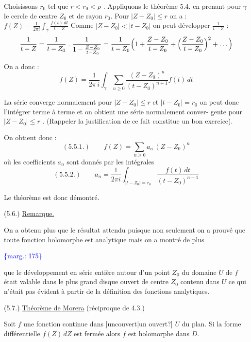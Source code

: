 \documentclass[11pt]{article}
\newcommand{\scanpage}[1]{\par\bigskip\noindent{\small\sffamily[scan #1]}\par}
\newcommand{\mspage}[1]{{\small\sffamily[p.\,#1]}}
\newcommand{\margin}[1]{\textcolor{blue}{\{\textsf{marg.:} #1\}}}
\newcommand{\uline}[1]{\underline{#1}}
\newcommand{\unsure}[1]{[#1?]}
\begin{document}
Choisissons \( r_0 \) tel que \( r < r_0 < \rho \) . Appliquons le théorème 5.4.
en prenant pour \( \gamma \) le cercle de centre \( Z_0 \) et de rayon \( r_0 \). Pour \( |Z-Z_0| \leq r \)
on a : \( f(Z) = \frac{1}{2 \pi i} \int_{\gamma} \frac{f(t)\, dt}{t - Z} \)
Comme \( |Z-Z_0| < |t-Z_0| \) on peut développer \( \frac{1}{t - Z} \) :
\[ \frac{1}{t - Z} = \frac{1}{t - Z_0} \;.\; \frac{1}{1 - \frac{Z-Z_0}{t-Z_0}} = \frac{1}{t - Z_0} \Bigl( 1 + \frac{Z - Z_0}{t - Z_0} + \Bigl( \frac{Z - Z_0}{t - Z_0} \Bigr)^2 + \dots \Bigr) \]

On a donc :
\[ f(Z) = \frac{1}{2 \pi \, i} \int_{\gamma} \sum_{n \geq 0} \frac{(Z-Z_0)^n}{(t-Z_0)^{n+1}} f(t)\, dt \]

La série converge normalement pour \( |Z - Z_0| \leq r \) et \( |t - Z_0| = r_0 \) on
peut donc l'intégrer terme à terme et on obtient une série normalement conver-%
gente pour \( |Z - Z_0| \leq r \) . (Rappeler la justification de ce fait constitue
un bon exercice).

On obtient donc :
\[ (5.5.1.) \qquad f(Z) = \sum_{n \geq 0} a_n \, (Z - Z_0)^n \]
où les coefficients \( a_n \) sont donnés par les intégrales
\[ (5.5.2.) \qquad a_n = \frac{1}{2 \pi i} \int_{|t-Z_0| = r_0} \frac{f(t)\, dt}{(t-Z_0)^{n+1}} \]

Le théorème est donc démontré.

(5.6.) \uline{Remarque.}

On a obtenu plus que le résultat attendu puisque non seulement on
a prouvé que toute fonction holomorphe est analytique mais on a montré de plus

\margin{175}

\clearpage
\scanpage{119/176}
\mspage{- 15 -}

que le développement en série entière autour d'un point $Z_0$ du domaine $U$
de $f$ était valable dans le plus grand disque ouvert de centre $Z_0$ contenu
dans $U$ ce qui n'était pas évident à partir de la définition des fonctions
analytiques.

(5.7.) \uline{Théorème de Morera} (réciproque de 4.3.)

Soit $f$ une fonction continue dans \unsure{uncouvert|un ouvert} $U$ du plan. Si la forme
différentielle $f(Z)\,dZ$ est fermée alors $f$ est holomorphe dans $D$.
\end{document}
